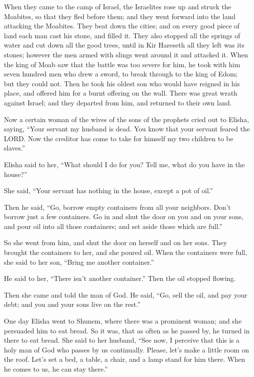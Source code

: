 \myverse{}When they came to the camp of Israel, the Israelites rose up
and struck the Moabites, so that they fled before them; and they went forward into the land attacking
the Moabites.
\myverse{}They beat down the cities; and on every good piece of land each man cast his
stone, and filled it. They also stopped all the springs of water and cut down all the good trees, until
in Kir Hareseth all they left was its stones; however the men armed with slings went around it and attacked
it.
\myverse{}When the king of Moab saw that the battle was too severe for him, he took
with him seven hundred men who drew a sword, to break through to the king of Edom; but they could not.
\myverse{}Then he took his oldest son who would have reigned in his place, and offered
him for a burnt offering on the wall. There was great wrath against Israel; and they departed from him,
and returned to their own land.


\mychapter{} \myverse*{}Now a certain woman of the wives of the sons of the prophets cried
out to Elisha, saying, “Your servant my husband is dead. You know that your servant feared the LORD. Now
the creditor has come to take for himself my two children to be slaves.”

\myverse{}Elisha said to her, “What should I do for you? Tell me, what do
you have in the house?”

She said, “Your servant has nothing in the house, except a pot of oil.”

\myverse{}Then he said, “Go, borrow empty containers from all your neighbors.
Don’t borrow just a few containers.
\myverse{}Go in and shut the door on you and on your sons, and pour oil into all those
containers; and set aside those which are full.”

\myverse{}So she went from him, and shut the door on herself and on her sons.
They brought the containers to her, and she poured oil.
\myverse{}When the containers were full, she said to her son, “Bring me another container.”

He said to her, “There isn’t another container.” Then the oil stopped flowing.

\myverse{}Then she came and told the man of God. He said, “Go, sell the oil,
and pay your debt; and you and your sons live on the rest.”

\myverse{}One day Elisha went to Shunem, where there was a prominent woman;
and she persuaded him to eat bread. So it was, that as often as he passed by, he turned in there to eat
bread.
\myverse{}She said to her husband, “See now, I perceive that this is a holy man of God
who passes by us continually.
\myverse{}Please, let’s make a little room on the roof. Let’s set a bed, a table, a
chair, and a lamp stand for him there. When he comes to us, he can stay there.”

